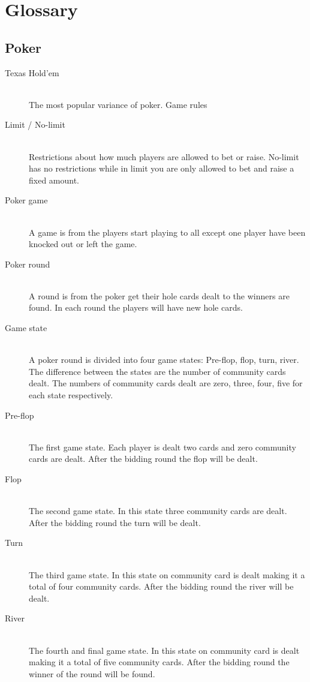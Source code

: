 \section*{Glossary}

\subsection*{Poker}
\begin{description}
  \item[Texas Hold'em] \hfill \\
  The most popular variance of poker. Game rules \cite{rules}
  \item[Limit / No-limit] \hfill \\
  Restrictions about how much players are allowed to bet or raise. No-limit has no restrictions while in limit you are only allowed to bet and raise a fixed amount.
  \item[Poker game] \hfill \\
  A game is from the players start playing to all except one player have been knocked out or left the game. 
  \item[Poker round] \hfill \\
  A round is from the poker get their hole cards dealt to the winners are found. In each round the players will have new hole cards.
  \item[Game state] \hfill \\
  A poker round is divided into four game states: Pre-flop, flop, turn, river. The difference between the states are the number of community cards dealt. The numbers of community cards dealt are zero, three, four, five for each state respectively. 
  \item[Pre-flop] \hfill \\
  The first game state. Each player is dealt two cards and zero community cards are dealt. After the bidding round the flop will be dealt.
  \item[Flop] \hfill \\
  The second game state. In this state three community cards are dealt. After the bidding round the turn will be dealt.
  \item[Turn] \hfill \\
  The third game state. In this state on community card is dealt making it a total of four community cards. After the bidding round the river will be dealt.
  \item[River] \hfill \\
  The fourth and final game state. In this state on community card is dealt making it a total of five community cards. After the bidding round the winner of the round will be found.
\end{description}




